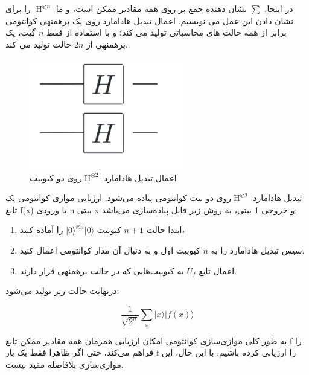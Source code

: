 \documentclass{book}
\begin{document}
در اینجا، $\sum$ نشان دهنده جمع بر روی همه مقادیر ممکن  است، و ما $\operatorname{H}^{\otimes n}$ را برای نشان دادن این عمل می نویسیم.
اعمال تبدیل هادامارد روی یک برهمنهی کوانتومی برابر از همه حالت های محاسباتی تولید می کند؛ و با استفاده از فقط $n$ گیت، یک برهمنهی از $2n$ حالت تولید می کند.
\begin{center}
	\begin{figure}[ht]
		\centering
		\includegraphics[width=0.6\textwidth]{Multyhadamard.png}
		\caption{اعمال تبدیل هادامارد $\operatorname{H}^{\otimes 2}$روی دو کیوبیت}
	\end{figure}
\end{center}

تبدیل هادامارد $\operatorname{H}^{\otimes 2}$روی دو بیت کوانتومی پیاده می‌شود. ارزیابی موازی کوانتومی یک تابع f(x) با ورودی n بیتی x و خروجی 1 بیتی، به روش زیر قابل پیاده‌سازی می‌باشد:

\begin{enumerate}
	\item ابتدا حالت $n + 1$ کیوبیت $\vert0\rangle^{\otimes n} \vert 0\rangle$ را آماده کنید،
	\item سپس تبدیل هادامارد را به $n$ کیوبیت اول و به دنبال آن مدار کوانتومی اعمال کنید.
	\item اعمال تابع $U_{f}$ به کیوبیت‌هایی که در حالت برهمنهی قرار دارند.
\end{enumerate}
درنهایت حالت زیر تولید ‌می‌شود:

\begin{center}
\begin{equation}
\frac{1}{\sqrt{2^n}} \sum_{x} \vert x \rangle \vert f (x)\rangle
\end{equation}
\end{center}


به طور کلی موازی‌سازی کوانتومی امکان ارزیابی همزمان همه مقادیر ممکن تابع f را فراهم می‌کند، حتی اگر ظاهرا فقط یک بار f را ارزیابی کرده باشیم. با این حال، این موازی‌سازی بلافاصله مفید نیست. 
\end{document}
